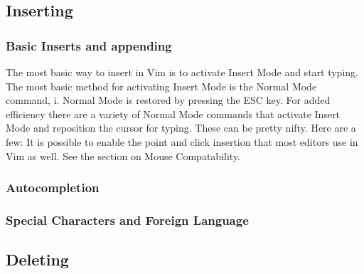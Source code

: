 \documentclass[12pt, oneside]{book}
\begin{document}
  \subsection{Inserting}
    \subsubsection{Basic Inserts and appending}
The most basic way to insert in Vim is to activate Insert Mode and start typing.  The most basic method for activating Insert Mode is the Normal Mode command, i.  Normal Mode is restored by pressing
the ESC key.  For added efficiency there are a variety of Normal Mode commands that activate Insert Mode and reposition the cursor for typing.  These can be pretty nifty.  Here are a few:
It is possible to enable the point and click insertion that most editors use in Vim as well.  See the section on Mouse Compatability.
    \subsubsection{Autocompletion}
    \subsubsection{Special Characters and Foreign Language}
  \subsection{Deleting}
\end{document}
